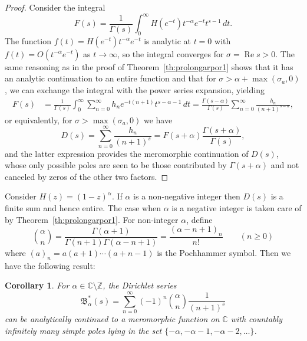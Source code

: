 \documentclass[11pt,a4paper]{amsart}
\newcommand{\Z}{\mathbb{Z}}
\newcommand{\C}{\mathbb{C}}
\renewcommand{\Re}{\operatorname{Re}}
\theoremstyle{plain}
\theoremstyle{plain}
\newtheorem{corollary}{Corollary}
\theoremstyle{plain}
\theoremstyle{definition}
\theoremstyle{remark}
\begin{document}
\begin{proof}
Consider the integral
\[
  F(s) = \frac{1}{\Gamma(s)} \int_{0}^{\infty} H(e^{-t}) t^{-\alpha}e^{-t} t^{s-1}\,dt.
\]
The function $f(t) = H(e^{-t}) t^{-\alpha} e^{-t}$ is analytic at $t = 0$ with $f(t) = O(t^{-\alpha} e^{-t})$ as $t \to \infty$, so the integral converges for $\sigma = \Re s > 0$. The same reasoning as in the proof of Theorem~\ref{th:prolongarpor1} shows that it has an analytic continuation to an entire function and that for $\sigma > \alpha + \max(\sigma_{a},0)$, we can exchange the integral with the power series expansion, yielding
\begin{align*}
  F(s)
  &= \frac{1}{\Gamma(s)} \int_{0}^{\infty} \sum_{n=0}^{\infty} h_{n} e^{-t(n+1)} t^{s-\alpha-1}\,dt
  = \frac{\Gamma(s-\alpha)}{\Gamma(s)} \sum_{n=0}^{\infty} \frac{h_{n}}{(n+1)^{s-\alpha}},
\end{align*}
or equivalently, for $\sigma > \max(\sigma_{a},0)$ we have
\[
  D(s) = \sum_{n=0}^{\infty} \frac{h_{n}}{(n+1)^{s}}
  = F(s+\alpha) \frac{\Gamma(s+\alpha)}{\Gamma(s)},
\]
and the latter expression provides the meromorphic continuation of $D(s)$, whose only possible poles are seen to be those contributed by $\Gamma(s+\alpha)$ and not canceled by zeros of the other two factors.
\end{proof}


Consider $H(z) = (1-z)^\alpha$. If $\alpha$ is a non-negative integer then $D(s)$ is a finite sum and hence entire. The case when $\alpha$ is a negative integer is taken care of by Theorem~\ref{th:prolongarpor1}. For non-integer $\alpha$, define
\[
  \binom{\alpha}{n} = \frac{\Gamma(\alpha+1)}{\Gamma(n+1)\Gamma(\alpha-n+1)}
  = \frac{(\alpha-n+1)_n}{n!} \qquad (n\geq 0)
\]
where $(a)_n = a(a+1)\cdots(a+n-1)$ is the Pochhammer symbol.
Then we have the following result:

\begin{corollary}
\label{cor:potencias_alfa}
For $\alpha \in \C \setminus \Z$, the Dirichlet series
\[
  \mathfrak{B}^{*}_\alpha(s) = \sum_{n=0}^{\infty} (-1)^{n} \binom{\alpha}{n} \frac{1}{(n+1)^s}
\]
can be analytically continued to a meromorphic function on $\C$ with countably infinitely many simple poles lying in the set $\{-\alpha,\allowbreak-\alpha-1,\allowbreak-\alpha-2,\ldots\}$.
\end{corollary}
\end{document}
